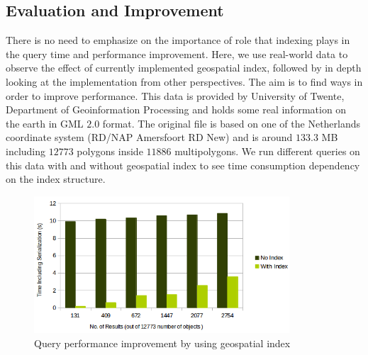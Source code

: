 \documentclass[a4paper,12pt]{article}
\begin{document}
\subsection{Evaluation and Improvement}
\label{BXevaluation}
There is no need to emphasize on the importance of role that indexing plays in the query time and performance improvement. Here, we use real-world data to observe the effect of currently implemented geospatial index, followed by in depth looking at the implementation from other perspectives. The aim is to find ways in order to improve performance. This data is provided by University of Twente, Department of Geoinformation Processing and holds some real information on the earth in GML $2.0$ format. The original file is based on one of the Netherlands coordinate system (RD/NAP Amersfoort RD New) and is around $133.3$ MB including $12773$ polygons inside $11886$ multipolygons.
We run different queries on this data with and without geospatial index to see time consumption dependency on the index structure. 
\begin{figure}
\centering
\includegraphics[width=0.85\textwidth]{IndexEfficiency-2}
\caption{Query performance improvement by using geospatial index}
\label{figIndexEfficiency}
\end{figure}
\end{document}
